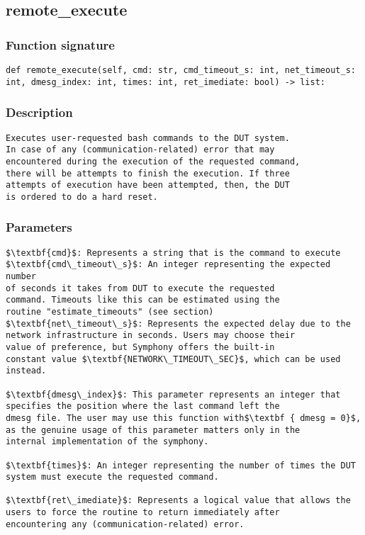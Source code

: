 \subsection{remote\_execute}

\subsubsection{Function signature}
\begin{lstlisting}
def remote_execute(self, cmd: str, cmd_timeout_s: int, net_timeout_s: int, dmesg_index: int, times: int, ret_imediate: bool) -> list:
\end{lstlisting}

\subsubsection{Description}
\begin{lstlisting}[mathescape=true, keywordstyle=\color{black}, showstringspaces=false]
Executes user-requested bash commands to the DUT system. 
In case of any (communication-related) error that may 
encountered during the execution of the requested command, 
there will be attempts to finish the execution. If three 
attempts of execution have been attempted, then, the DUT 
is ordered to do a hard reset. 
\end{lstlisting}

\subsubsection{Parameters}
\begin{lstlisting}[mathescape=true, keywordstyle=\color{black}]
$\textbf{cmd}$: Represents a string that is the command to execute
$\textbf{cmd\_timeout\_s}$: An integer representing the expected number 
of seconds it takes from DUT to execute the requested 
command. Timeouts like this can be estimated using the 
routine "estimate_timeouts" (see section)
$\textbf{net\_timeout\_s}$: Represents the expected delay due to the
network infrastructure in seconds. Users may choose their
value of preference, but Symphony offers the built-in
constant value $\textbf{NETWORK\_TIMEOUT\_SEC}$, which can be used
instead.

$\textbf{dmesg\_index}$: This parameter represents an integer that 
specifies the position where the last command left the 
dmesg file. The user may use this function with$\textbf { dmesg = 0}$, 
as the genuine usage of this parameter matters only in the 
internal implementation of the symphony.

$\textbf{times}$: An integer representing the number of times the DUT 
system must execute the requested command. 

$\textbf{ret\_imediate}$: Represents a logical value that allows the
users to force the routine to return immediately after
encountering any (communication-related) error.
\end{lstlisting}



